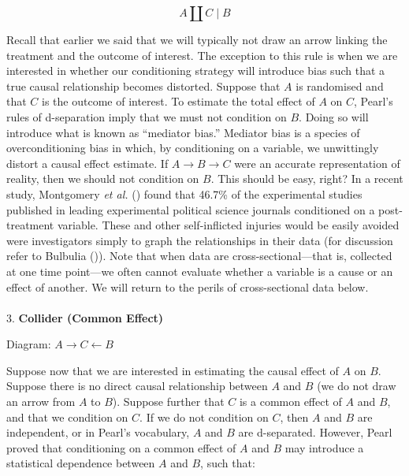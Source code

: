 \documentclass[
  singlecolumn]{article}
\makeatletter
\let\oldparagraph\paragraph
\renewcommand{\paragraph}{
    \@ifstar
      \xxxParagraphStar
      \xxxParagraphNoStar
  }
\newcommand{\xxxParagraphStar}[1]{\oldparagraph*{#1}\mbox{}}
\newcommand{\xxxParagraphNoStar}[1]{\oldparagraph{#1}\mbox{}}
\makeatother
\begin{document}
\[
A \coprod C \mid B
\]

Recall that earlier we said that we will typically not draw an arrow
linking the treatment and the outcome of interest. The exception to this
rule is when we are interested in whether our conditioning strategy will
introduce bias such that a true causal relationship becomes distorted.
Suppose that \(A\) is randomised and that \(C\) is the outcome of
interest. To estimate the total effect of \(A\) on \(C\), Pearl's rules
of d-separation imply that we must not condition on \(B\). Doing so will
introduce what is known as ``mediator bias.'' Mediator bias is a species
of overconditioning bias in which, by conditioning on a variable, we
unwittingly distort a causal effect estimate. If
\(A \rightarrow B \rightarrow C\) were an accurate representation of
reality, then we should not condition on \(B\). This should be easy,
right? In a recent study, Montgomery \emph{et al.}
() found that 46.7\% of the
experimental studies published in leading experimental political science
journals conditioned on a post-treatment variable. These and other
self-inflicted injuries would be easily avoided were investigators
simply to graph the relationships in their data (for discussion refer to
Bulbulia ()). Note that
when data are cross-sectional---that is, collected at one time
point---we often cannot evaluate whether a variable is a cause or an
effect of another. We will return to the perils of cross-sectional data
below.

\paragraph{\texorpdfstring{3. \textbf{Collider (Common
Effect)}}{3. Collider (Common Effect)}}\label{collider-common-effect}

Diagram: \(A \rightarrow \boxed{C} \leftarrow B\)

Suppose now that we are interested in estimating the causal effect of
\(A\) on \(B\). Suppose there is no direct causal relationship between
\(A\) and \(B\) (we do not draw an arrow from \(A\) to \(B\)). Suppose
further that \(C\) is a common effect of \(A\) and \(B\), and that we
condition on \(C\). If we do not condition on \(C\), then \(A\) and
\(B\) are independent, or in Pearl's vocabulary, \(A\) and \(B\) are
d-separated. However, Pearl proved that conditioning on a common effect
of \(A\) and \(B\) may introduce a statistical dependence between \(A\)
and \(B\), such that:
\end{document}
